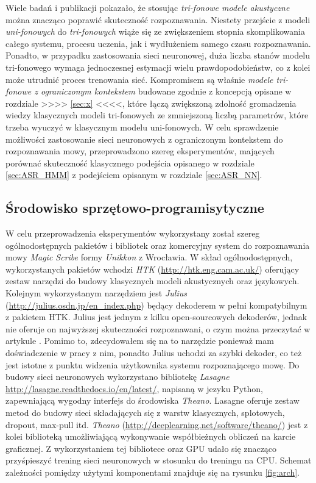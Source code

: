 \documentclass[11pt]{article}
\begin{document}
	Wiele badań i publikacji pokazało, że stosując \textit{tri-fonowe modele akustyczne} można znacząco poprawić skuteczność rozpoznawania. Niestety przejście z modeli \textit{uni-fonowych} do \textit{tri-fonowych} wiąże się ze zwiększeniem stopnia skomplikowania całego systemu, procesu uczenia, jak i wydłużeniem samego czasu rozpoznawania. Ponadto, w przypadku zastosowania sieci neuronowej, duża liczba stanów modelu tri-fonowego wymaga jednoczesnej estymacji wielu prawdopodobieństw, co z kolei może utrudnić proces trenowania sieć. Kompromisem są właśnie \textit{modele tri-fonowe z ograniczonym kontekstem} budowane zgodnie z koncepcją opisane w rozdziale >>>> \ref{sec:x} <<<<, które łączą zwiększoną zdolność gromadzenia wiedzy klasycznych modeli tri-fonowych ze zmniejszoną liczbą parametrów, które trzeba wyuczyć w klasycznym modelu uni-fonowych. 
	W celu sprawdzenie możliwości zastosowanie sieci neuronowych z ograniczonym kontekstem do rozpoznawania mowy, przeprowadzono szereg eksperymentów, mających porównać skuteczność klasycznego podejścia opisanego w rozdziale \ref{sec:ASR_HMM} z podejściem opisanym w rozdziale \ref{sec:ASR_NN}. 
	
	
	\subsection{ Środowisko sprzętowo-programisytyczne }
	
	W celu przeprowadzenia eksperymentów wykorzystany został szereg ogólnodostępnych pakietów i bibliotek oraz komercyjny system do rozpoznawania mowy \textit{Magic Scribe} formy \textit{Unikkon} z Wrocławia. W skład ogólnodostępnych, wykorzystanych pakietów wchodzi \textit{HTK} (\url{http://htk.eng.cam.ac.uk/}) oferujący zestaw narzędzi do budowy klasycznych modeli akustycznych oraz językowych. Kolejnym wykorzystanym narzędziem jest \textit{Julius} (\url{http://julius.osdn.jp/en_index.php}) będący dekoderem w pełni kompatybilnym z pakietem HTK. Julius jest jednym z kilku open-sourcowych dekoderów, jednak nie oferuje on najwyższej skuteczności rozpoznawani, o czym można przeczytać w artykule \cite{asr_toolkit_cmp}. Pomimo to, zdecydowałem się na to narzędzie ponieważ mam doświadczenie w pracy z nim, ponadto Julius uchodzi za szybki dekoder, co też jest istotne z punktu widzenia użytkownika systemu rozpoznającego mowę. Do budowy sieci neuronowych wykorzystano bibliotekę \textit{Lasagne} \url{http://lasagne.readthedocs.io/en/latest/}, napisaną w jezyku Python, zapewniającą wygodny interfejs do środowiska \textit{Theano}. Lasagne oferuje zestaw metod do budowy sieci składających się z warstw klasycznych, splotowych, dropout, max-pull itd. \textit{Theano} (\url{http://deeplearning.net/software/theano/}) jest z kolei biblioteką umożliwiającą wykonywanie współbieżnych obliczeń na karcie graficznej. Z wykorzystaniem tej bibliotece oraz GPU udało się znacząco przyśpieszyć trening sieci neuronowych w stosunku do treningu na CPU. Schemat zależności pomiędzy użytymi komponentami znajduje się na rysunku \ref{fig:arch}. 
	
\end{document}
